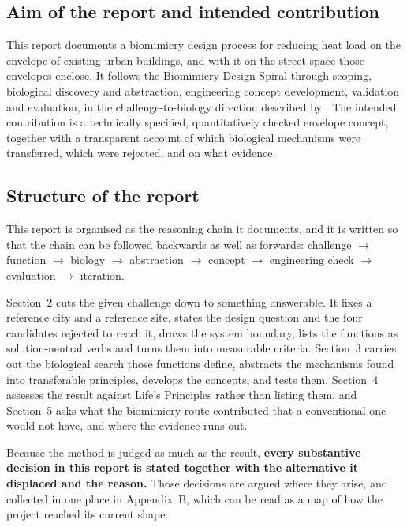 \subsection{Aim of the report and intended contribution}

This report documents a biomimicry design process for reducing heat load on the
envelope of existing urban buildings, and with it on the street space those
envelopes enclose. It follows the Biomimicry Design Spiral
\parencite{baumeister2014} through scoping, biological discovery and
abstraction, engineering concept development, validation and evaluation, in the
challenge-to-biology direction described by \textcite{helms2009}. The
intended contribution is a technically specified, quantitatively checked
envelope concept, together with a transparent account of which biological
mechanisms were transferred, which were rejected, and on what evidence.

\subsection{Structure of the report}

This report is organised as the reasoning chain it documents, and it is written so
that the chain can be followed backwards as well as forwards: challenge
$\rightarrow$ function $\rightarrow$ biology $\rightarrow$ abstraction
$\rightarrow$ concept $\rightarrow$ engineering check $\rightarrow$ evaluation
$\rightarrow$ iteration.

Section~2 cuts the given challenge down to something answerable. It fixes a
reference city and a reference site, states the design question and the four
candidates rejected to reach it, draws the system boundary, lists the functions
as solution-neutral verbs and turns them into measurable criteria. Section~3
carries out the biological search those functions define, abstracts the
mechanisms found into transferable principles, develops the concepts, and tests
them. Section~4 assesses the result against Life's Principles rather than
listing them, and Section~5 asks what the biomimicry route contributed that a
conventional one would not have, and where the evidence runs out.

Because the method is judged as much as the result, \textbf{every substantive
decision in this report is stated together with the alternative it displaced and
the reason.} Those decisions are argued where they arise, and collected in one place
in Appendix~B, which can be read as a map of how the project reached its current
shape.
